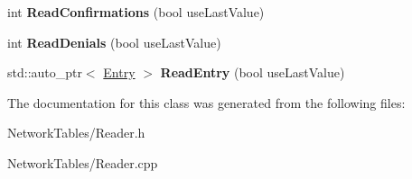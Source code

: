 \begin{DoxyCompactItemize}
\item 
\hypertarget{classNetworkTables_1_1Reader_ad5dfe0002a854e31c610551e8fb47803}{
int {\bfseries ReadConfirmations} (bool useLastValue)}
\label{classNetworkTables_1_1Reader_ad5dfe0002a854e31c610551e8fb47803}

\item 
\hypertarget{classNetworkTables_1_1Reader_ac84d029ec982a6af833cbf4546ffdf7b}{
int {\bfseries ReadDenials} (bool useLastValue)}
\label{classNetworkTables_1_1Reader_ac84d029ec982a6af833cbf4546ffdf7b}

\item 
\hypertarget{classNetworkTables_1_1Reader_a37953838a421091689531f80ef4f348e}{
std::auto\_\-ptr$<$ \hyperlink{classNetworkTables_1_1Entry}{Entry} $>$ {\bfseries ReadEntry} (bool useLastValue)}
\label{classNetworkTables_1_1Reader_a37953838a421091689531f80ef4f348e}

\end{DoxyCompactItemize}


The documentation for this class was generated from the following files:\begin{DoxyCompactItemize}
\item 
NetworkTables/Reader.h\item 
NetworkTables/Reader.cpp\end{DoxyCompactItemize}
